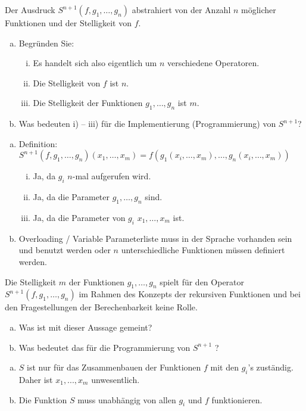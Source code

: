 \begin{card}
  Der Ausdruck $S^{n+1}(f, g_1, \ldots, g_n)$ abstrahiert von der Anzahl $n$ möglicher Funktionen und der Stelligkeit von $f$.
  \begin{enumerate}[a)]
    \item Begründen Sie:
    \begin{enumerate}[i)]
      \item Es handelt sich also eigentlich um $n$ verschiedene Operatoren.
      \item Die Stelligkeit von $f$ ist $n$.
      \item Die Stelligkeit der Funktionen $g_1, \ldots, g_n$ ist $m$.
    \end{enumerate}
    \item Was bedeuten i) – iii) für die Implementierung (Programmierung) von $S^{n+1}$?
  \end{enumerate}
  \hr
  \begin{enumerate}[a)]
    \item Definition: $S^{n+1}(f, g_1, \ldots, g_n)(x_1, \ldots, x_m) = f(g_1(x_i, \ldots, x_m), \ldots, g_n(x_i, \ldots, x_m))$
    \begin{enumerate}[i)]
      \item Ja, da $g_i$ $n$-mal aufgerufen wird.
      \item Ja, da die Parameter $g_1, \ldots, g_n$ sind.
      \item Ja, da die Parameter von $g_i$ $x_1, \ldots, x_m$ ist.
    \end{enumerate}
    \item Overloading / Variable Parameterliste muss in der Sprache vorhanden sein und benutzt werden oder $n$ unterschiedliche Funktionen müssen definiert werden.
  \end{enumerate}
\end{card}

\begin{card}
  Die Stelligkeit $m$ der Funktionen $g_1, \ldots, g_n$ spielt für den Operator $S^{n+1}(f, g_1, \ldots, g_n)$ im Rahmen des Konzepts der rekursiven Funktionen und bei den Fragestellungen der Berechenbarkeit keine Rolle.
  \begin{enumerate}[a)]
    \item Was ist mit dieser Aussage gemeint?
    \item Was bedeutet das für die Programmierung von $S^{n+1}$ ?
  \end{enumerate}
  \hr
  \begin{enumerate}[a)]
    \item $S$ ist nur für das Zusammenbauen der Funktionen $f$ mit den $g_i$'s zuständig. Daher ist $x_1, ..., x_m$
      unwesentlich.
    \item Die Funktion $S$ muss unabhängig von allen $g_i$ und $f$ funktionieren.
  \end{enumerate}
\end{card}

